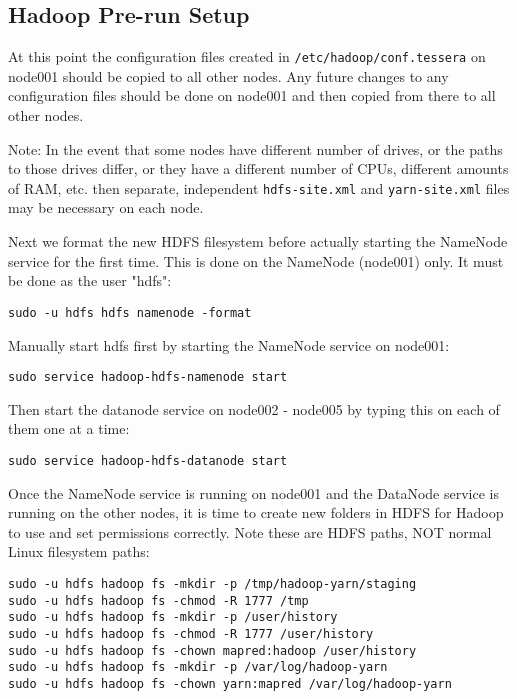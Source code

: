\subsection{Hadoop Pre-run Setup}
At this point the configuration files created in
\verb|/etc/hadoop/conf.tessera| on node001 should be copied to all
other nodes.  Any future changes to any configuration files should be
done on node001 and then copied from there to all other nodes.

Note: In the event that some nodes have different number of drives,
or the paths to those drives differ, or they have a different number
of CPUs, different amounts of RAM, etc. then separate, independent
\verb|hdfs-site.xml| and \verb|yarn-site.xml| files may be necessary on
each node.

Next we format the new HDFS filesystem before actually starting the
NameNode service for the first time.  This is done on the NameNode
(node001) only.  It must be done as the user "hdfs":

\begin{verbatim}
sudo -u hdfs hdfs namenode -format
\end{verbatim}

Manually start hdfs first by starting the NameNode service on node001:

\begin{verbatim}
sudo service hadoop-hdfs-namenode start
\end{verbatim}

Then start the datanode service on node002 - node005 by typing this on
each of them one at a time:

\begin{verbatim}
sudo service hadoop-hdfs-datanode start
\end{verbatim}

Once the NameNode service is running on node001 and the DataNode service
is running on the other nodes, it is time to create new folders in HDFS
for Hadoop to use and set permissions correctly.  Note these are HDFS
paths, NOT normal Linux filesystem paths:

\begin{verbatim}
sudo -u hdfs hadoop fs -mkdir -p /tmp/hadoop-yarn/staging
sudo -u hdfs hadoop fs -chmod -R 1777 /tmp
sudo -u hdfs hadoop fs -mkdir -p /user/history
sudo -u hdfs hadoop fs -chmod -R 1777 /user/history
sudo -u hdfs hadoop fs -chown mapred:hadoop /user/history
sudo -u hdfs hadoop fs -mkdir -p /var/log/hadoop-yarn
sudo -u hdfs hadoop fs -chown yarn:mapred /var/log/hadoop-yarn
\end{verbatim}

